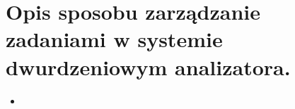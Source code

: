 \section{Opis sposobu zarządzanie zadaniami w systemie dwurdzeniowym analizatora.}

\begin{itemize}
    \item 

\end{itemize}